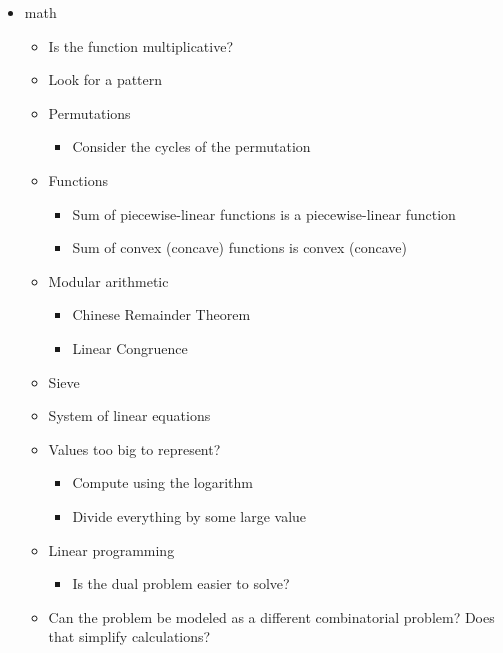 \documentclass[9pt,a4paper,landscape,oneside]{amsart}
\newenvironment{myitemize}
{\begin{itemize}[leftmargin=.3cm]
	\setlength{\itemsep}{0pt}
	\setlength{\parskip}{0pt}
	\setlength{\parsep}{0pt}     }
{ \end{itemize}                  }
\begin{document}
\begin{multicols*}{3}
\begin{myitemize}
\begin{myitemize}
			\item Look at the DFS tree (which has no cross-edges)
			\item Is the graph a DFA or NFA?
				\begin{myitemize}
					\item Is it the Synchronizing word problem?
				\end{myitemize}
		\end{myitemize}
	\item math
		\begin{myitemize}
			\item Is the function multiplicative?
			\item Look for a pattern
			\item Permutations
				\begin{myitemize}
					\item Consider the cycles of the permutation
				\end{myitemize}
			\item Functions
				\begin{myitemize}
					\item Sum of piecewise-linear functions is a piecewise-linear function
					\item Sum of convex (concave) functions is convex (concave)
				\end{myitemize}
			\item Modular arithmetic
				\begin{myitemize}
					\item Chinese Remainder Theorem
					\item Linear Congruence
				\end{myitemize}
			\item Sieve
			\item System of linear equations
			\item Values too big to represent?
				\begin{myitemize}
					\item Compute using the logarithm
					\item Divide everything by some large value
				\end{myitemize}
			\item Linear programming
				\begin{myitemize}
					\item Is the dual problem easier to solve?
				\end{myitemize}
			\item Can the problem be modeled as a different combinatorial problem? Does that simplify calculations?

\end{myitemize}
\end{myitemize}
\end{multicols*}
\end{document}
